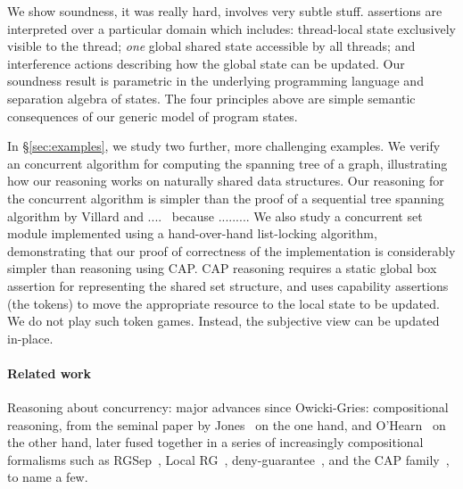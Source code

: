We show soundness, it was really hard, involves very subtle stuff. 
\colosl
assertions are interpreted over a particular domain which includes:
{thread-local} state exclusively visible to the thread; {\em one}
global shared state accessible by all threads; and { interference
actions}  describing how the global state can be updated.
Our soundness result is parametric in the underlying
  programming language and separation algebra of states. The four
  principles above are simple semantic consequences of our generic
  model of program states.

In \S\ref{sec:examples}, we 
study two further, more challenging examples. We verify an concurrent algorithm for
computing the spanning tree of a graph, illustrating how our reasoning
works on naturally shared data structures. Our  \colosl reasoning for
the concurrent algorithm 
is simpler than the proof of a sequential tree spanning algorithm
by Villard and ....~\cite{??}  because ......... We also study a concurrent set module
implemented using a hand-over-hand list-locking algorithm,
demonstrating that our proof of correctness of the implementation is
considerably simpler than reasoning using CAP. CAP reasoning requires
a static global box assertion for representing the shared set
structure, and uses capability assertions (the tokens) 
to move the appropriate resource to the local state to be
updated. We do not play such token games. Instead, the subjective
view can be updated in-place. 










\paragraph{Related work}




Reasoning about concurrency: major advances since Owicki-Gries:
compositional reasoning, from the seminal paper by Jones~\cite{rg} on
the one hand, and O'Hearn~\cite{csl-orig,csl-tcs} on the other hand,
later fused together in a series of increasingly compositional
formalisms such as RGSep~\cite{viktor-marriage}, Local RG~\cite{lrg},
deny-guarantee~\cite{dg}, and the CAP
family~\cite{cap-ecoop10,icap,tada}, to name a few.


